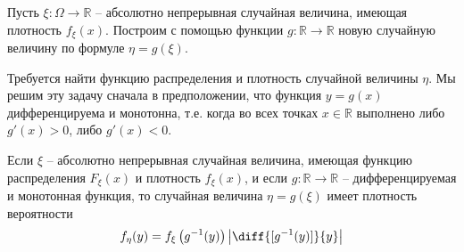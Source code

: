 \begin{zam}
Пусть $\xi : \Omega \to \mathbb{R}$ -- абсолютно непрерывная случайная величина, имеющая плотность $f_\xi (x)$. Построим с помощью функции $g : \mathbb{R} \to \mathbb{R}$ новую случайную величину по формуле $\eta = g(\xi)$. 

Требуется найти функцию распределения и плотность случайной величины $\eta$. Мы решим эту задачу сначала в предположении, что функция $y = g(x)$ дифференцируема и монотонна, т.е. когда во всех точках $x \in \mathbb{R}$ выполнено либо $g′(x) > 0$, либо $g′(x) < 0$.	
\end{zam}
\begin{theorem}
	\label{th:14.2}
Если $\xi$ -- абсолютно непрерывная случайная величина, имеющая функцию распределения $F_\xi (x)$ и плотность $f_\xi (x)$, и если $g :\mathbb{R} \to \mathbb{R}$ -- дифференцируемая и монотонная функция, то случайная величина $\eta = g(\xi)$ имеет плотность вероятности
\begin{equation*}
	f_\eta(y)=f_\xi\left(g^{-1}(y)\right)\left|\diff{[g^{-1}(y)]}{y}\right|
\end{equation*}
\end{theorem}
